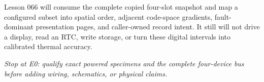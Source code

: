 \documentclass[10pt]{article}
\begin{document}
Lesson 066 will consume the complete copied four-slot snapshot and map a
configured subset into spatial order, adjacent code-space gradients,
fault-dominant presentation pages, and caller-owned record intent. It still
will not drive a display, read an RTC, write storage, or turn these digital
intervals into calibrated thermal accuracy.

\textit{Stop at E0: qualify exact powered specimens and the complete
four-device bus before adding wiring, schematics, or physical claims.}
\end{document}

